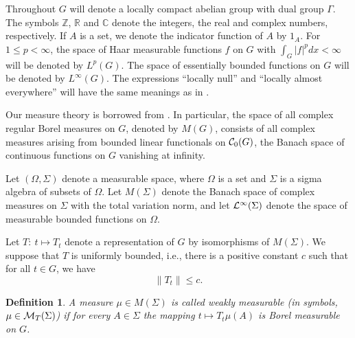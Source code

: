 \documentclass[12pt]{article}
\newcommand{\R}{\mathbb R}
\newcommand{\C}{\mathbb C}
\newcommand{\Z}{\mathbb Z}
\renewcommand{\O}{\Omega}
\newcommand{\cL}{{\cal L}}
\newcommand{\cC}{{\cal C}}
\newtheorem{defin}{Definition}[section]
\begin{document}
Throughout $G$ will denote a 
locally compact abelian group with dual group
$\Gamma$.  
The symbols $\Z$, $\R$ and $\C$ 
denote the integers, the real and complex numbers, respectively.  
If $A$ is a set, we denote the indicator
function of $A$ by $1_A$.
For $1\leq p<\infty$,
the space of Haar measurable functions $f$ on $G$ with
$\int_G|f|^p dx<\infty$ will be denoted by 
$L^p(G)$.  The space of essentially
bounded functions on $G$ will be denoted by 
$L^\infty(G)$.  The expressions ``locally null''
and ``locally almost everywhere'' will have the same meanings as
in \cite[Definition (11.26)]{hr1}.

Our measure theory is borrowed from
\cite{hr1}.
In particular, the space of all complex regular Borel measures 
on $G$,
denoted by $M(G)$, consists of all complex measures  
arising from bounded linear functionals on $\cC_0(G)$,
the Banach space of continuous functions on
$G$ vanishing at infinity. 
 
Let $(\O, \Sigma)$ denote a
measurable space, 
where $\O$ is a set and $\Sigma$ is a
sigma algebra of subsets of $\O$.  Let $M(\Sigma)$ denote the 
Banach space of complex measures on $\Sigma$ with the
total variation norm, and let
$\cL^\infty(\Sigma)$ denote the space of measurable
bounded functions on $\Omega$.  

Let
$T:\ t\mapsto T_t$ denote a representation of $G$
by isomorphisms of $M(\Sigma)$.  
We suppose that $T$ is uniformly bounded,
i.e., there is a positive constant $c$ such that
for all $t\in G$, we have
\begin{equation}
\|T_t\|\leq c .
\label{uniformlybded}
\end{equation}
\begin{defin}
A measure $\mu\in M(\Sigma)$ is 
called weakly measurable (in symbols, $\mu\in{\cal M}_T(\Sigma)$)
if for every $A\in \Sigma$ 
the mapping $t\mapsto T_t\mu(A)$ is 
Borel measurable on $G$.  
\label{weakmble}
\end{defin}
\end{document}
